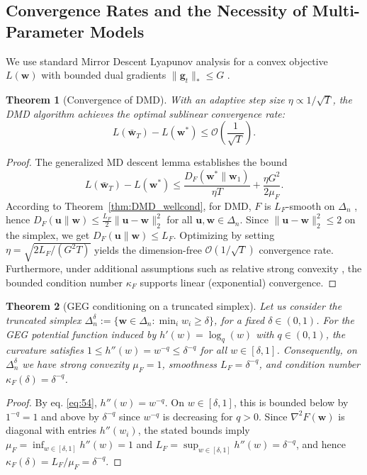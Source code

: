 \documentclass[10pt]{amsart}
\newcommand{\bg}{\boldsymbol{g}}
\newcommand{\bu}{\boldsymbol{u}}
\newcommand{\bw}{\boldsymbol{w}}
\newtheorem{theorem}{Theorem}
\theoremstyle{definition}
\theoremstyle{definition}	 %
\begin{document}
\subsection{Convergence Rates and the Necessity of Multi-Parameter Models}
\label{sec:convergence}

We use standard Mirror Descent Lyapunov analysis for a convex objective $L(\bw)$ with bounded dual gradients $\|\bg_t\|_* \le G$ \cite{Beck2003,Nemirowsky}.

\begin{theorem}[Convergence of DMD] \label{thm:DMD_conv}
With an adaptive step size $\eta \propto 1/\sqrt{T}$, the DMD algorithm achieves the optimal sublinear convergence rate:
\begin{equation}
    L(\bar{\bw}_T) - L(\bw^*) \le \mathcal{O}\left(\frac{1}{\sqrt{T}}\right).
\end{equation}
\end{theorem}
\begin{proof}
The generalized MD descent lemma \cite{Beck2003} establishes the bound
$$L(\bar{\bw}_T) - L(\bw^*) \leq \frac{D_F(\bw^*\|\bw_1)}{\eta T} + \frac{\eta G^2}{2\mu_F}.$$ 
According to Theorem~\ref{thm:DMD_wellcond}, for DMD, $F$ is $L_F$-smooth on $\Delta_n$ , hence
$D_F(\bu\|\bw)\le \tfrac{L_F}{2}\|\bu-\bw\|_2^2$ for all $\bu,\bw\in\Delta_n$. Since $\|\bu-\bw\|_2^2\le 2$ on the simplex, we get $D_F(\bu\|\bw)\le L_F$. Optimizing by setting $\eta = \sqrt{2L_F/(G^2 T)}$ yields the dimension-free $\mathcal{O}(1/\sqrt{T})$ convergence rate. Furthermore, under additional assumptions such as relative strong convexity \cite{LuFreundNesterov2018}, the bounded condition number $\kappa_F$ supports linear (exponential) convergence.
\end{proof}

\begin{theorem}[GEG conditioning on a truncated simplex] \label{thm:GEG_conv}
Let us consider the truncated simplex
$\Delta_n^{\delta}:=\{\bw\in\Delta_n:\min_i w_i\ge \delta\}$, for a fixed $\delta\in(0,1)$. For the GEG
potential function induced by $h'(w)=\log_q(w)$ with $q\in(0,1)$, the curvature satisfies
\(
1 \le h''(w)=w^{-q} \le \delta^{-q}
\) for all $w\in[\delta,1]$. Consequently, on $\Delta_n^{\delta}$ we have
strong convexity $\mu_F=1$, smoothness $L_F=\delta^{-q}$, and condition number
$\kappa_F(\delta)=\delta^{-q}$.
\end{theorem}
\begin{proof}
By eq. \eqref{eq:54}, $h''(w)=w^{-q}$. On $w\in[\delta,1]$, this is bounded below by
$1^{-q}=1$ and above by $\delta^{-q}$ since $w^{-q}$ is decreasing for $q>0$.
Since $\nabla^2F(\bw)$ is diagonal with entries $h''(w_i)$, the stated bounds imply
$\mu_F=\inf_{w\in[\delta,1]} h''(w)=1$ and $L_F=\sup_{w\in[\delta,1]} h''(w)=\delta^{-q}$,
and hence $\kappa_F(\delta)=L_F/\mu_F=\delta^{-q}$.
\end{proof}
\end{document}
